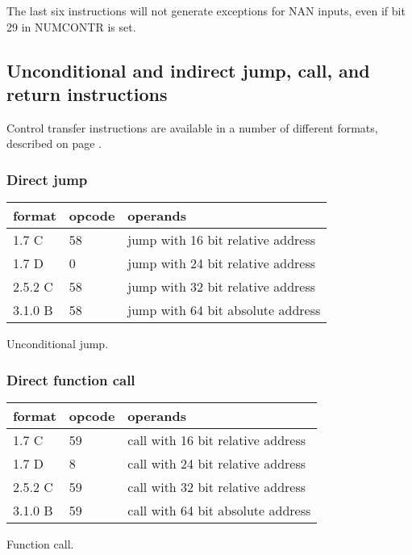 \documentclass[forwardcom.tex]{subfiles}
\begin{document}
The last six instructions will not generate exceptions for NAN inputs, even if bit 29 in NUMCONTR is set.


\subsection{Unconditional and indirect jump, call, and return instructions}
Control transfer instructions are available in a number of different formats, described on 
page \pageref{table:jumpInstructionFormats}.


\subsubsection{Direct jump}
\label{table:jumpInstruction}
\begin{tabular}{|p{14mm}|p{12mm}|p{110mm}|}
\hline
\bfseries format & \bfseries opcode & \bfseries operands \\ \hline
1.7 C & 58 & jump with 16 bit relative address \\ \hline
1.7 D &  0 & jump with 24 bit relative address \\ \hline
2.5.2 C & 58 & jump with 32 bit relative address \\ \hline
3.1.0 B & 58 & jump with 64 bit absolute address \\ \hline
\end{tabular}
\vspace{2mm}

Unconditional jump.


\subsubsection{Direct function call}
\label{table:callInstruction}
\begin{tabular}{|p{14mm}|p{12mm}|p{110mm}|}
\hline
\bfseries format & \bfseries opcode & \bfseries operands \\ \hline
1.7 C & 59 & call with 16 bit relative address \\ \hline
1.7 D &  8 & call with 24 bit relative address \\ \hline
2.5.2 C & 59 & call with 32 bit relative address \\ \hline
3.1.0 B & 59 & call with 64 bit absolute address \\ \hline
\end{tabular}
\vspace{2mm}

Function call.
\vspace{2mm}
\end{document}

